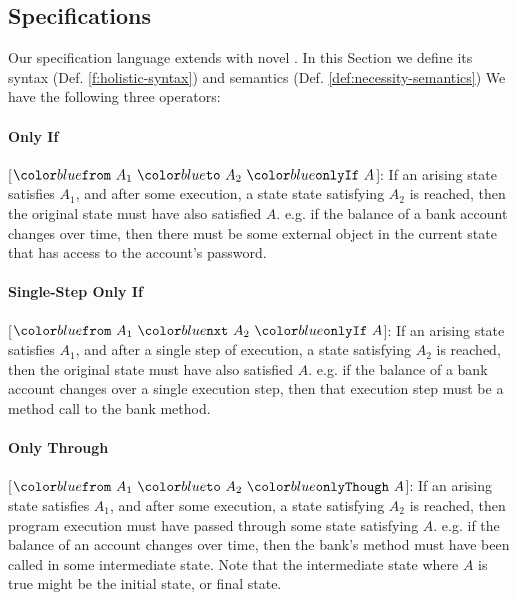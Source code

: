 \subsection {\Nec Specifications}
\label{s:holistic-guarantees}

Our \Nec specification language extends \SpecO with novel 
.
In this Section we define its syntax (Def. \ref{f:holistic-syntax}) and semantics 
(Def. \ref{def:necessity-semantics})
We have the following three operators:






\paragraph{Only If}
[$\onlyIf{A_1}{A_2}{A}$]: If an arising %
  state satisfies $A_1$, and after some execution, a state %
  state satisfying $A_2$ is reached, 
then the original %
state must have also satisfied $A$.
e.g. if the balance of a bank account changes over time, then there must be some external object in the current 
state that has access to the account's password.

\paragraph{Single-Step Only If}
[$\onlyIfSingle{A_1}{A_2}{A}$]: If an arising %
  state satisfies $A_1$, and after a single step of execution, a state satisfying $A_2$ is reached, 
then the original %
state must have also satisfied $A$.
e.g. if the balance of a bank account changes over a single execution step, then that execution step must be a method call to the bank  method.

\paragraph{Only Through}
[$\onlyThrough{A_1}{A_2}{A}$]: If an arising %
 state satisfies $A_1$, and after some execution, a state satisfying $A_2$ is reached, then program execution must have passed through some state satisfying $A$.
e.g. if the balance of an account changes over time, then the bank's  method must have been called 
in some intermediate state. Note 
that the intermediate state where $A$ is true might be the initial state,
or final state.

